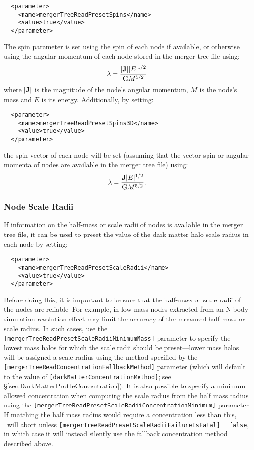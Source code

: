 \begin{verbatim}
  <parameter>
    <name>mergerTreeReadPresetSpins</name>
    <value>true</value>
  </parameter>
\end{verbatim}

The spin parameter is set using the spin of each node if available, or otherwise using the angular momentum of each node stored in the merger tree file using:
\begin{equation}
 \lambda = {|{\bf J}| |E|^{1/2} \over {\rm G} M^{5/2}}
\end{equation}
where $|{\bf J}|$ is the magnitude of the node's angular momentum, $M$ is the node's mass and $E$ is its energy. Additionally, by setting:

\begin{verbatim}
  <parameter>
    <name>mergerTreeReadPresetSpins3D</name>
    <value>true</value>
  </parameter>
\end{verbatim}
the spin vector of each node will be set (assuming that the vector spin or angular momenta of nodes are available in the merger tree file) using:
\begin{equation}
 {\boldmath \lambda} = {{\bf J} |E|^{1/2} \over {\rm G} M^{5/2}}.
\end{equation}

\subsubsection{Node Scale Radii}

If information on the half-mass or scale radii of nodes is available in the merger tree file, it can be used to preset the value of the dark matter halo scale radius in each node by setting:

\begin{verbatim}
  <parameter>
    <name>mergerTreeReadPresetScaleRadii</name>
    <value>true</value>
  </parameter>
\end{verbatim}

Before doing this, it is important to be sure that the half-mass or scale radii of the nodes are reliable. For example, in low mass nodes extracted from an N-body simulation resolution effect may limit the accuracy of the measured half-mass or scale radius. In such cases, use the {\tt [mergerTreeReadPresetScaleRadiiMinimumMass]} parameter to specify the lowest mass halos for which the scale radii should be preset---lower mass halos will be assigned a scale radius using the method specified by the {\tt [mergerTreeReadConcentrationFallbackMethod]} parameter (which will default to the value of {\tt [darkMatterConcentrationMethod]}; see \S\ref{sec:DarkMatterProfileConcentration}). It is also possible to specify a minimum allowed concentration when computing the scale radius from the half mass radius using the {\tt [mergerTreeReadPresetScaleRadiiConcentrationMinimum]} parameter. If matching the half mass radius would require a concentration less than this, \glc\ will abort unless {\tt [mergerTreeReadPresetScaleRadiiFailureIsFatal]}$=${\tt false}, in which case it will instead silently use the fallback concentration method described above.

